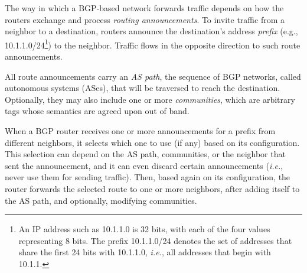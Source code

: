 \documentclass[numbers, 10pt, preprint]{sigplanconf}
\newcommand{\IE}{\emph{i.e.}}
\newcommand{\ETC}{\emph{etc.}}
\begin{document}
The way in which a BGP-based network forwards traffic depends on how the routers exchange and process \emph{routing announcements}. To invite traffic from a neighbor to a destination, routers announce the destination's address {\em prefix} (e.g., 10.1.1.0/24\footnote{An IP address
such as 10.1.1.0 is 32 bits, with each of the four values representing 8 bits. The prefix 10.1.1.0/24 denotes the set of addresses that share the first 24 bits with 10.1.1.0, \IE, all addresses that begin with 10.1.1.}) to the neighbor. Traffic flows in the opposite direction to such route announcements.

All route announcements carry an {\em AS path}, the sequence of BGP networks, called autonomous systems (ASes), that will be traversed to reach the destination.
Optionally, they may also include one or more {\em communities}, which are arbitrary tags whose semantics are agreed upon out of band.

When a BGP router receives one or more announcements for a prefix from different neighbors, it selects which one to use (if any) based on its configuration. This selection can depend on the AS path, communities, or the neighbor that sent the announcement, and it can even discard certain announcements (\IE, never use them for sending traffic). Then, based again on its configuration, the router forwards the selected route to one or more neighbors, after adding itself to the AS path, and optionally, modifying communities.

\end{document}
